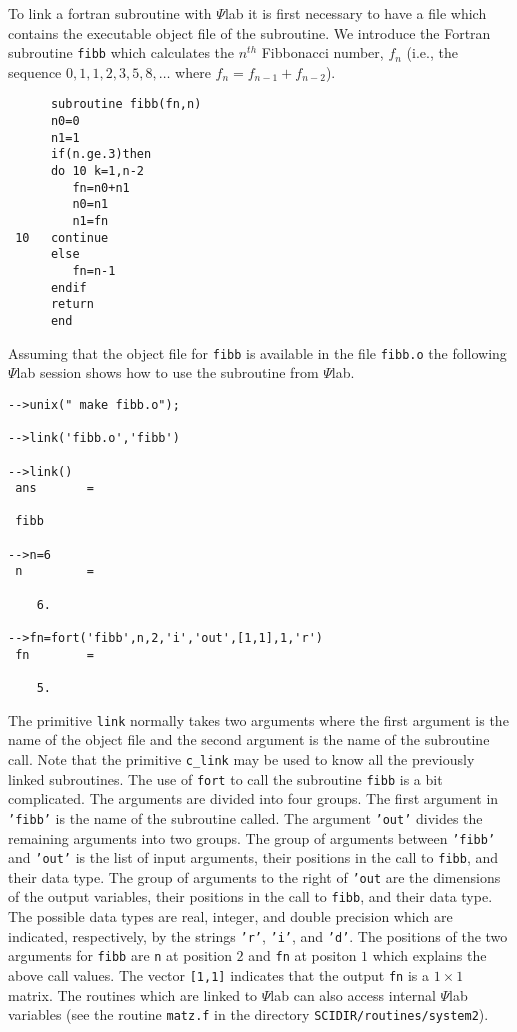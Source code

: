 	To link a fortran subroutine with $\Psi$lab it is first necessary
to have a file which contains the executable object file of the subroutine.
We introduce the Fortran subroutine {\tt fibb} which calculates the
$n^{th}$ Fibbonacci number, $f_n$ (i.e., the sequence $0,1,1,2,3,5,8,\ldots$
where $f_n=f_{n-1}+f_{n-2}$).
\begin{verbatim}
      subroutine fibb(fn,n)
      n0=0
      n1=1
      if(n.ge.3)then
      do 10 k=1,n-2
         fn=n0+n1
         n0=n1
         n1=fn
 10   continue
      else
         fn=n-1
      endif
      return
      end
\end{verbatim}
Assuming that the object file for {\tt fibb} is available in the
file {\tt fibb.o} the following $\Psi$lab session shows how to use
the subroutine from $\Psi$lab.
\begin{verbatim}
-->unix(" make fibb.o");
 
-->link('fibb.o','fibb')
 
-->link()
 ans       =
 
 fibb                   
 
-->n=6
 n         =
 
    6.  
 
-->fn=fort('fibb',n,2,'i','out',[1,1],1,'r')
 fn        =
 
    5.  
\end{verbatim}
The primitive {\tt link} normally takes two arguments where the
first argument is the name of the object file and the second argument
is the name of the subroutine call.  Note that the primitive \verb!c_link!
may be used to know  all the previously linked subroutines.  
The use of {\tt fort} to call the subroutine {\tt fibb}
is a bit complicated.  The arguments are divided into four groups.
The first argument in {\tt 'fibb'} is the name of the subroutine called.
The argument {\tt 'out'} divides the remaining arguments into two 
groups.  The group of arguments between {\tt 'fibb'} and {\tt 'out'}
is the list of input arguments, their positions in the call to {\tt fibb},
and their data type.  The group of arguments to the right of {\tt 'out}
are the dimensions of the output variables, their positions in the call
to {\tt fibb}, and their data type.
The possible data types are real, integer, and double precision which
are indicated, respectively, by the strings {\tt 'r'}, {\tt 'i'}, and
{\tt 'd'}.  The positions of the two arguments for {\tt fibb} are
{\tt n} at position $2$ and {\tt fn} at positon $1$ which explains
the above call values.  The vector {\tt [1,1]} indicates that the output
{\tt fn} is a $1\times 1$ matrix.
The routines which are linked to $\Psi$lab can also access internal 
$\Psi$lab variables (see the routine {\tt matz.f}
in the directory {\tt SCIDIR/routines/system2}).

